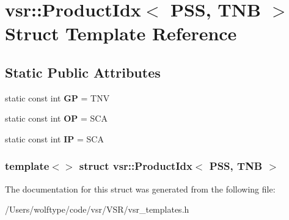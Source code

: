 \hypertarget{structvsr_1_1_product_idx_3_01_p_s_s_00_01_t_n_b_01_4}{\section{vsr\-:\-:Product\-Idx$<$ P\-S\-S, T\-N\-B $>$ Struct Template Reference}
\label{structvsr_1_1_product_idx_3_01_p_s_s_00_01_t_n_b_01_4}
}
\subsection*{Static Public Attributes}
\begin{DoxyCompactItemize}
\item 
\hypertarget{structvsr_1_1_product_idx_3_01_p_s_s_00_01_t_n_b_01_4_a073b25bf623632598c795214af5c14f4}{static const int {\bfseries G\-P} = T\-N\-V}\label{structvsr_1_1_product_idx_3_01_p_s_s_00_01_t_n_b_01_4_a073b25bf623632598c795214af5c14f4}

\item 
\hypertarget{structvsr_1_1_product_idx_3_01_p_s_s_00_01_t_n_b_01_4_a1f0469656507d1985fa4176424dc7133}{static const int {\bfseries O\-P} = S\-C\-A}\label{structvsr_1_1_product_idx_3_01_p_s_s_00_01_t_n_b_01_4_a1f0469656507d1985fa4176424dc7133}

\item 
\hypertarget{structvsr_1_1_product_idx_3_01_p_s_s_00_01_t_n_b_01_4_adfd89d55a7ec552e5b8969a8c6023df4}{static const int {\bfseries I\-P} = S\-C\-A}\label{structvsr_1_1_product_idx_3_01_p_s_s_00_01_t_n_b_01_4_adfd89d55a7ec552e5b8969a8c6023df4}

\end{DoxyCompactItemize}
\subsubsection*{template$<$$>$ struct vsr\-::\-Product\-Idx$<$ P\-S\-S, T\-N\-B $>$}



The documentation for this struct was generated from the following file\-:\begin{DoxyCompactItemize}
\item 
/\-Users/wolftype/code/vsr/\-V\-S\-R/vsr\-\_\-templates.\-h\end{DoxyCompactItemize}
